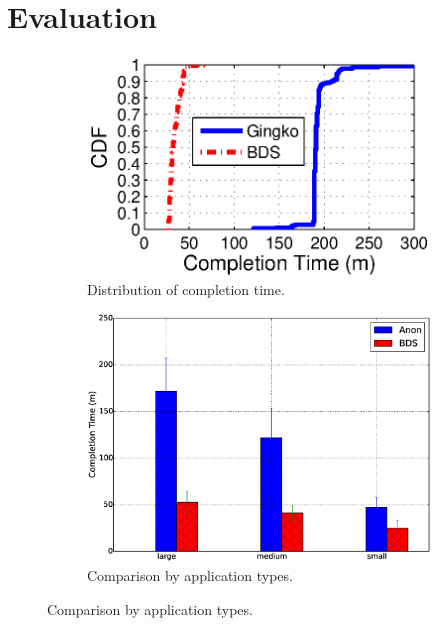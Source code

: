 \section{Evaluation}
\label{sec:evaluation}
\begin{figure}[t]
        \centering
        \begin{subfigure}[b]{0.3\textwidth}
                \centering
                \includegraphics[width=\textwidth]{images/BDSvsAnon_overall_v2.eps}
                \caption{Distribution of completion time.}
                \label{fig:BDSvsAnon:overall}
        \end{subfigure}
        \begin{subfigure}[b]{0.3\textwidth}%
                \centering
                \includegraphics[width=\textwidth]{images/BDS_VS_ANON_v2.eps}
                \caption{Comparison by application types.}

\end{subfigure}
\end{figure}
